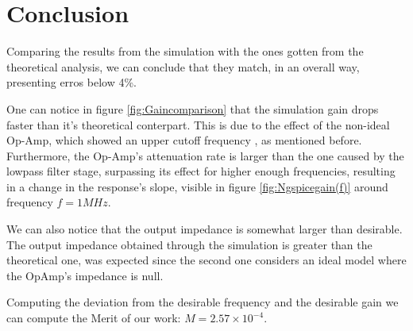 \section{Conclusion}
\label{sec:conclusion}

\par Comparing the results from the simulation with the ones gotten from the theoretical analysis, we can conclude that they match, in an overall way, presenting erros below 4\%.

\par One can notice in figure \ref{fig:Gaincomparison} that the simulation gain drops faster than it's theoretical conterpart. This is due to the effect of the non-ideal Op-Amp, which showed an upper cutoff frequency , as mentioned before. Furthermore, the Op-Amp's attenuation rate is larger than the one caused by the lowpass filter stage, surpassing its effect for higher enough frequencies, resulting in a change in the response's slope, visible in figure \ref{fig:Ngspicegain(f)} around frequency $f = 1 MHz$.

\par We can also notice that the output impedance is somewhat larger than desirable. The output impedance obtained through the simulation is greater than the theoretical one, was expected since the second one considers an ideal model where the OpAmp's impedance is null.

\par Computing the deviation from the desirable frequency and the desirable gain we can compute the Merit of our work: $M=2.57\times 10^{-4}$.
